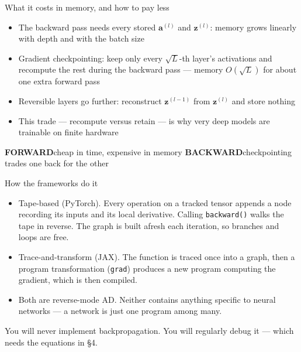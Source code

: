 \documentclass[aspectratio=169, 11pt]{beamer}
\newcommand{\fbpar}[2]{%
  \vfill
  {\scriptsize
  \begin{tcolorbox}[enhanced, sidebyside, sidebyside align=top,
                    lefthand ratio=0.485,
                    segmentation style={shc!35, line width=0.6pt},
                    colback=shc!5, colframe=shc!35, boxrule=0.5pt,
                    arc=1.2mm, left=1.6mm, right=1.6mm,
                    top=0.6mm, bottom=0.6mm,
                    before skip=0pt, after skip=0pt]
    {\color{shc}\textbf{FORWARD}}\hspace{0.55em}#1
  \tcblower
    {\color{dpc}\textbf{BACKWARD}}\hspace{0.55em}#2
  \end{tcolorbox}}%
  \vspace{0.35em}%
}
\newcommand{\src}[3]{}      %
\begin{document}
\begin{frame}{What it costs in memory, and how to pay less}
  \src{prince2023}{page}{114}
  \vspace{0.3em}
  {\small
  \begin{itemize}\setlength{\itemsep}{5pt}
    \item The backward pass needs every stored $\mathbf{a}^{(l)}$ and
          $\mathbf{z}^{(l)}$: memory grows \alert{linearly with depth}
          and with the batch size
    \item \alert{Gradient checkpointing}: keep only every
          $\sqrt{L}$-th layer's activations and recompute the rest
          during the backward pass --- memory $O(\sqrt{L})$ for about
          one extra forward pass
    \item \alert{Reversible layers} go further: reconstruct
          $\mathbf{z}^{(l-1)}$ from $\mathbf{z}^{(l)}$ and store
          nothing
    \item This trade --- recompute versus retain --- is why very deep
          models are trainable on finite hardware
  \end{itemize}}
  \fbpar{cheap in time, expensive in memory}
        {checkpointing trades one back for the other}
\end{frame}

\begin{frame}{How the frameworks do it}
  \src{prince2023}{section}{7.4.2}
  \src{baydin2018}{section}{5}
  \vspace{0.3em}
  {\small
  \begin{itemize}\setlength{\itemsep}{4pt}
    \item \alert{Tape-based (PyTorch).} Every operation on a tracked
          tensor appends a node recording its inputs and its local
          derivative. Calling \texttt{backward()} walks the tape in
          reverse. The graph is built afresh each iteration, so
          branches and loops are free.
    \item \alert{Trace-and-transform (JAX).} The function is traced
          once into a graph, then a program transformation
          (\texttt{grad}) produces a new program computing the
          gradient, which is then compiled.
    \item Both are reverse-mode AD. Neither contains anything specific
          to neural networks --- a network is just one program among
          many.
  \end{itemize}}
  \vspace{0.3em}
  \begin{redhighlight}
    {\small You will never implement backpropagation. You will
    regularly \alert{debug} it --- which needs the equations in \S4.}
  \end{redhighlight}
\end{frame}
\end{document}

